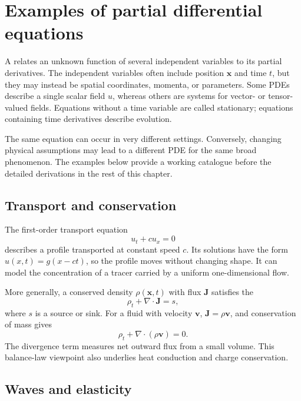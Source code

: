 \section{Examples of partial differential equations}

A  relates an unknown function of several independent variables to its partial derivatives. The independent variables often include position $\mathbf{x}$ and time $t$, but they may instead be spatial coordinates, momenta, or parameters. Some PDEs describe a single scalar field $u$, whereas others are systems for vector- or tensor-valued fields. Equations without a time variable are called stationary; equations containing time derivatives describe evolution.

The same equation can occur in very different settings. Conversely, changing physical assumptions may lead to a different PDE for the same broad phenomenon. The examples below provide a working catalogue before the detailed derivations in the rest of this chapter.

\subsection{Transport and conservation}

The first-order transport equation
\begin{equation}
u_t+c u_x=0
\end{equation}
describes a profile transported at constant speed $c$. Its solutions have the form $u(x,t)=g(x-ct)$, so the profile moves without changing shape. It can model the concentration of a tracer carried by a uniform one-dimensional flow.

More generally, a conserved density $\rho(\mathbf{x},t)$ with flux $\mathbf{J}$ satisfies the 
\begin{equation}
\rho_t+\nabla\cdot\mathbf{J}=s,
\end{equation}
where $s$ is a source or sink. For a fluid with velocity $\mathbf{v}$, $\mathbf{J}=\rho\mathbf{v}$, and conservation of mass gives
\begin{equation}
\rho_t+\nabla\cdot(\rho\mathbf{v})=0.
\end{equation}
The divergence term measures net outward flux from a small volume. This balance-law viewpoint also underlies heat conduction and charge conservation.

\subsection{Waves and elasticity}

